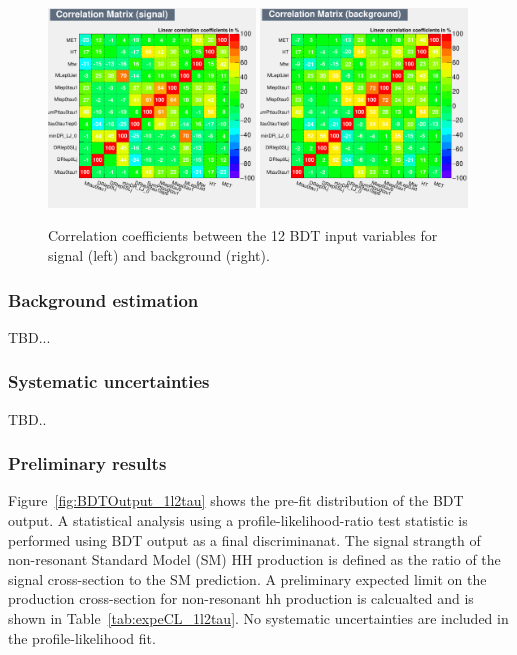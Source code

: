 \begin{figure}[htbp]
  \begin{center}
    \includegraphics[width=0.49\textwidth, keepaspectratio]{figures/TauChannels/1l2tau/BDT/CorrelationMatrixS}
    \includegraphics[width=0.49\textwidth, keepaspectratio]{figures/TauChannels/1l2tau/BDT/CorrelationMatrixB}
  \end{center}
  \caption{\label{fig:CorreCoff_1l2tau} Correlation coefficients between the 12 BDT input variables for signal (left) and background (right).}
\end{figure}

\subsubsection{Background estimation}
TBD...

\subsubsection{Systematic uncertainties}
TBD..

\subsubsection{Preliminary results}

Figure~\ref{fig:BDTOutput_1l2tau} shows the pre-fit distribution of the BDT output. A statistical analysis using a profile-likelihood-ratio test statistic is performed using BDT output as a final discriminanat. The signal strangth of non-resonant Standard Model (SM) HH production is defined as the ratio of the signal cross-section to the SM prediction. A preliminary expected limit on the production cross-section for non-resonant hh production is calcualted and is shown in Table~\ref{tab:expeCL_1l2tau}. No systematic uncertainties are included in the profile-likelihood fit.

